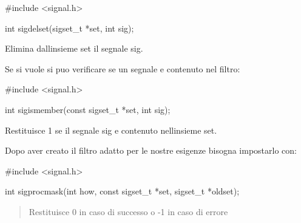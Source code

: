 \begin{DoxyCode}
\textcolor{preprocessor}{#include <signal.h>}

\textcolor{keywordtype}{int} sigdelset(sigset\_t *\textcolor{keyword}{set}, \textcolor{keywordtype}{int} sig);
\end{DoxyCode}
 Elimina dall\textquotesingle{}insieme {\ttfamily set} il segnale {\ttfamily sig}.

Se si vuole si puo\textquotesingle{} verificare se un segnale e\textquotesingle{} contenuto nel filtro\+: 
\begin{DoxyCode}
\textcolor{preprocessor}{#include <signal.h>}

\textcolor{keywordtype}{int} sigismember(\textcolor{keyword}{const} sigset\_t *\textcolor{keyword}{set}, \textcolor{keywordtype}{int} sig);
\end{DoxyCode}
 Restituisce 1 se il segnale {\ttfamily sig} e\textquotesingle{} contenuto nell\textquotesingle{}insieme {\ttfamily set}.

Dopo aver creato il filtro adatto per le nostre esigenze bisogna impostarlo con\+: 
\begin{DoxyCode}
\textcolor{preprocessor}{#include <signal.h>}

\textcolor{keywordtype}{int} sigprocmask(\textcolor{keywordtype}{int} how, \textcolor{keyword}{const} sigset\_t *\textcolor{keyword}{set}, sigset\_t *oldset);
\end{DoxyCode}
 \begin{quote}
Restituisce 0 in caso di successo o -\/1 in caso di errore \end{quote}



